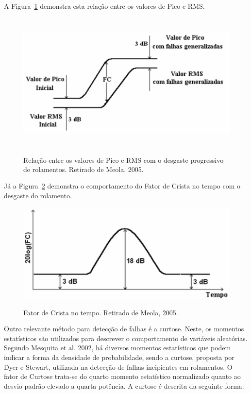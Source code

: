 \documentclass[
	12pt,				
	oneside,			
	a4paper,			
	english,			
	brazil,			
	]{abntex2ppgsi}
\begin{document}
A Figura~\ref{RelacaoPicoaPicoeRMS} demonstra esta relação entre os valores de Pico e RMS.  

\begin{figure}[!htb]
\centering
\caption {Relação entre os valores de Pico e RMS com o desgaste progressivo de rolamentos. Retirado de Meola, 2005.}
\includegraphics[width=\textwidth,height=70mm,keepaspectratio]{Figura18}
\label{RelacaoPicoaPicoeRMS}
\end{figure}	

Já a Figura~\ref{FatorCrista} demonstra o comportamento do Fator de Crista no tempo com o desgaste do rolamento.

\begin{figure}[!htb]
\centering
\caption {Fator de Crista no tempo. Retirado de Meola, 2005.}
\includegraphics[width=\textwidth,height=50mm,keepaspectratio]{Figura19}
\label{FatorCrista}
\end{figure}	

Outro relevante método para detecção de falhas é a curtose. Neste, os momentos estatísticos são utilizados para descrever o comportamento de variáveis aleatórias. Segundo Mesquita et al. 2002, há diversos momentos estatísticos que podem indicar a forma da densidade de probabilidade, sendo a curtose, proposta por Dyer e Stewart, utilizada na detecção de falhas incipientes em rolamentos. O fator de Curtose trata-se do quarto momento estatístico normalizado quanto ao desvio padrão elevado a quarta potência. A curtose é descrita da seguinte forma:
\end{document}
